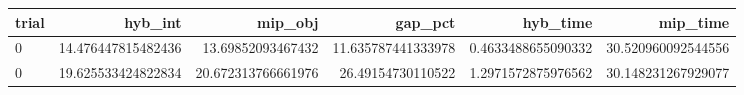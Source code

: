 \begin{tabular}{lrrrrr}
\hline
trial & hyb_int & mip_obj & gap_pct & hyb_time & mip_time \\ \hline
0 & 14.476447815482436 & 13.69852093467432 & 11.635787441333978 & 0.4633488655090332 & 30.520960092544556 \\
0 & 19.625533424822834 & 20.672313766661976 & 26.49154730110522 & 1.2971572875976562 & 30.148231267929077 \\
\hline
\end{tabular}
